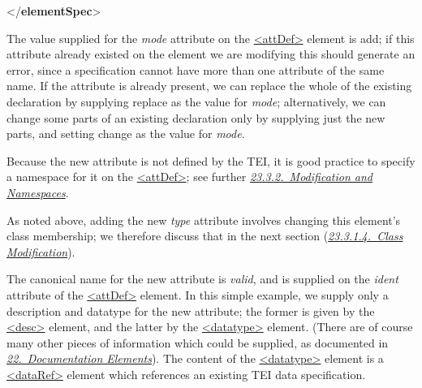 \begin{shaded}
\hspace*{1em}\hspace*{1em}\mbox{}\newline 
\hspace*{1em}\mbox{}\newline 
{}\mbox{}\newline 
{</\textbf{elementSpec}>}\end{shaded}\egroup\par \par
The value supplied for the {\itshape mode} attribute on the \hyperref[TEI.attDef]{<attDef>} element is add; if this attribute already existed on the element we are modifying this should generate an error, since a specification cannot have more than one attribute of the same name. If the attribute is already present, we can replace the whole of the existing declaration by supplying replace as the value for {\itshape mode}; alternatively, we can change some parts of an existing declaration only by supplying just the new parts, and setting change as the value for {\itshape mode}.\par
Because the new attribute is not defined by the TEI, it is good practice to specify a namespace for it on the \hyperref[TEI.attDef]{<attDef>}; see further \textit{\hyperref[MDNS]{23.3.2.\ Modification and Namespaces}}.\par
As noted above, adding the new {\itshape type} attribute involves changing this element's class membership; we therefore discuss that in the next section (\textit{\hyperref[MDMDCL]{23.3.1.4.\ Class Modification}}).\par
The canonical name for the new attribute is {\itshape valid}, and is supplied on the {\itshape ident} attribute of the \hyperref[TEI.attDef]{<attDef>} element. In this simple example, we supply only a description and datatype for the new attribute; the former is given by the \hyperref[TEI.desc]{<desc>} element, and the latter by the \hyperref[TEI.datatype]{<datatype>} element. (There are of course many other pieces of information which could be supplied, as documented in \textit{\hyperref[TD]{22.\ Documentation Elements}}). The content of the \hyperref[TEI.datatype]{<datatype>} element is a \hyperref[TEI.dataRef]{<dataRef>} element which references an existing TEI data specification.\par
